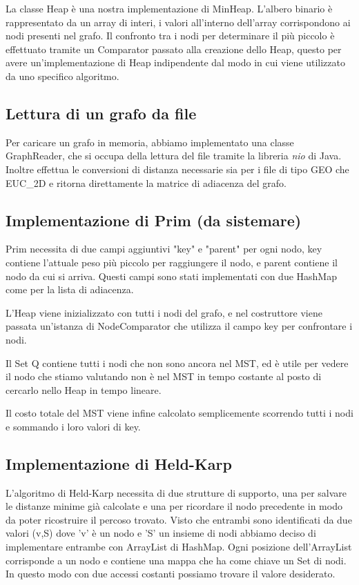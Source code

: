 La classe Heap è una nostra implementazione di MinHeap. L'albero binario è rappresentato da un array di interi, i valori all'interno dell'array corrispondono ai nodi presenti nel grafo. Il confronto tra i nodi per determinare il più piccolo è effettuato tramite un Comparator passato alla creazione dello Heap, questo per avere un'implementazione di Heap indipendente dal modo in cui viene utilizzato da uno specifico algoritmo.
\subsection{Lettura di un grafo da file}
Per caricare un grafo in memoria, abbiamo implementato una classe GraphReader, che si occupa della lettura del file tramite la libreria \textit{nio} di Java. Inoltre effettua le conversioni di distanza necessarie sia per i file di tipo GEO che EUC\_2D e ritorna direttamente la matrice di adiacenza del grafo.

\subsection{Implementazione di Prim (da sistemare)}
Prim necessita di due campi aggiuntivi "key" e "parent" per ogni nodo, key contiene l'attuale peso più piccolo per raggiungere il nodo, e parent contiene il nodo da cui si arriva. Questi campi sono stati implementati con due HashMap come per la lista di adiacenza.

L'Heap viene inizializzato con tutti i nodi del grafo, e nel costruttore viene passata un'istanza di NodeComparator che utilizza il campo key per confrontare i nodi.

Il Set Q contiene tutti i nodi che non sono ancora nel MST, ed è utile per vedere il nodo che stiamo valutando non è nel MST in tempo costante al posto di cercarlo nello Heap in tempo lineare.

Il costo totale del MST viene infine calcolato semplicemente scorrendo tutti i nodi e sommando i loro valori di key.

\subsection{Implementazione di Held-Karp}

L'algoritmo di Held-Karp necessita di due strutture di supporto, una per salvare le distanze minime già calcolate e una per ricordare il nodo precedente in modo da poter ricostruire il percoso trovato. Visto che entrambi sono identificati da due valori (v,S) dove 'v' è un nodo e 'S' un insieme di nodi abbiamo deciso di implementare entrambe con ArrayList di HashMap. Ogni posizione dell'ArrayList corrisponde a un nodo e contiene una mappa che ha come chiave un Set di nodi. In questo modo con due accessi costanti possiamo trovare il valore desiderato.

